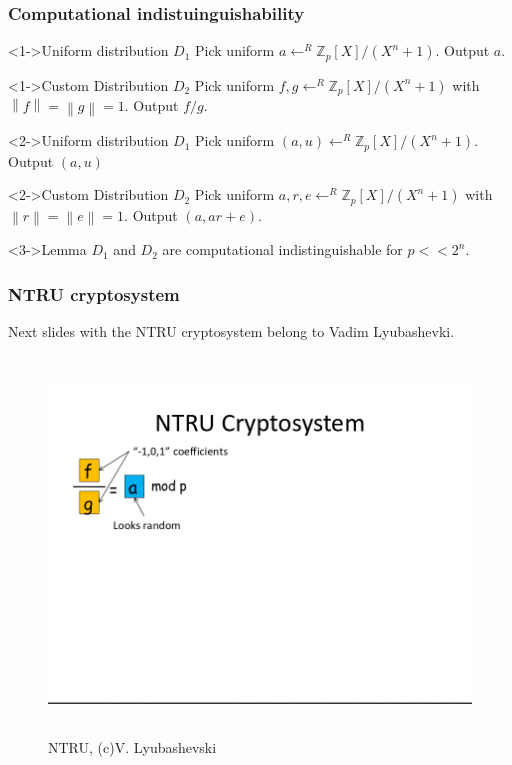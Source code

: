 \documentclass{beamer}
\newcommand{\norm}[1]{\left\lVert#1\right\rVert}
\begin{document}
\begin{frame}
    \frametitle{Computational indistuinguishability}

    \begin{block}<1->{Uniform distribution $D_1$}
        Pick uniform $a \leftarrow^R \mathbb{Z}_p[X] /(X^n + 1)$. Output $a$.
    \end{block}
    \begin{block}<1->{Custom Distribution $D_2$}
        Pick uniform $f, g \leftarrow^R \mathbb{Z}_p[X] / (X^n + 1)$ with $\norm{f} = \norm{g} = 1$. Output $f / g$.
    \end{block}

    \begin{block}<2->{Uniform distribution $D_1$}
        Pick uniform $(a, u) \leftarrow^R \mathbb{Z}_p[X] /(X^n + 1)$. Output $(a, u)$
    \end{block}
    \begin{block}<2->{Custom Distribution $D_2$}
        Pick uniform $a, r, e \leftarrow^R \mathbb{Z}_p[X] / (X^n + 1)$ with $\norm{r} = \norm{e} = 1$. Output $(a, ar + e)$.
    \end{block}
    \begin{block}<3->{Lemma}
        $D_1$ and $D_2$ are computational indistinguishable for $p << 2^n$.
    \end{block}
\end{frame}

\begin{frame}
    \frametitle{NTRU cryptosystem}
    Next slides with the NTRU cryptosystem belong to Vadim Lyubashevki.
\end{frame}
\begin{frame}
    \begin{figure}
            \includegraphics[width=12cm,height=10cm,keepaspectratio]{img/vadim1.png}
            \caption{NTRU, (c)V. Lyubashevski}
        \end{figure}
\end{frame}
\end{document}
